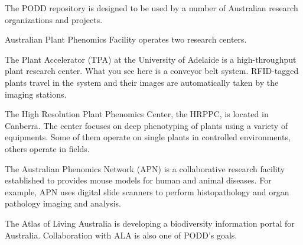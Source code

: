 \documentclass[ignorenonframetext,compress]{beamer}
\begin{document}
The PODD repository is designed to be used by a number of Australian
research organizations and projects.

Australian Plant Phenomics Facility operates two research centers.

The Plant Accelerator (TPA) at the University of Adelaide is a
high-throughput plant research center. What you see here is a
conveyor belt system. RFID-tagged plants travel in the system and
their images are automatically taken by the imaging stations.

The High Resolution Plant Phenomics Center, the HRPPC, is located
in Canberra. The center focuses on deep phenotyping of plants
using a variety of equipments. Some of them operate on single 
plants in controlled environments, others operate in fields.

The Australian Phenomics Network (APN) is a collaborative research
facility established to provides mouse models for human and animal
diseases. For example, APN uses digital slide scanners to perform
histopathology and organ pathology imaging and analysis.

The Atlas of Living Australia is developing a biodiversity 
information portal for Australia. Collaboration with ALA is 
also one of PODD's goals.
\end{document}
